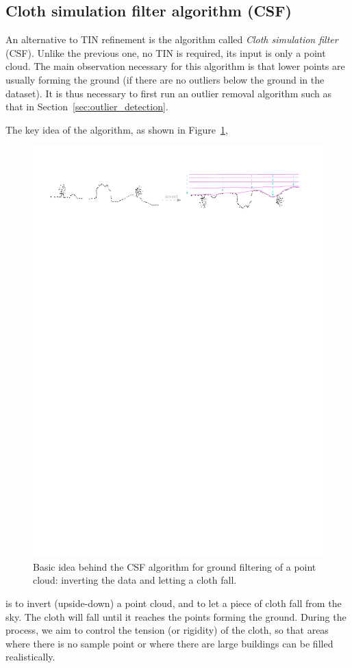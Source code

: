%
\subsection{Cloth simulation filter algorithm (CSF)}

An alternative to TIN refinement is the algorithm called \emph{Cloth simulation filter} (CSF).
Unlike the previous one, no TIN is required, its input is only a point cloud.
The main observation necessary for this algorithm is that lower points are usually forming the ground (if there are no outliers below the ground in the dataset).
It is thus necessary to first run an outlier removal algorithm such as that in Section~\ref{sec:outlier_detection}.

%

The key idea of the algorithm, as shown in Figure~\ref{fig:csf_idea},
\begin{figure}
  \centering
  \includegraphics[width=0.95\linewidth]{figs/csf_idea}
  \caption{Basic idea behind the CSF algorithm for ground filtering of a point cloud: inverting the data and letting a cloth fall.}%
\label{fig:csf_idea}
\end{figure}
is to invert (upside-down) a point cloud, and to let a piece of cloth fall from the sky.
The cloth will fall until it reaches the points forming the ground.
During the process, we aim to control the tension (or rigidity) of the cloth, so that areas where there is no sample point or where there are large buildings can be filled realistically.

